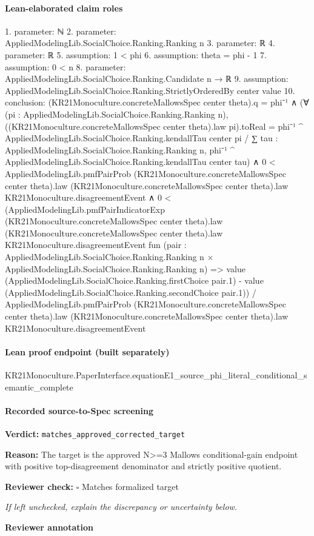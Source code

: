 \documentclass[10pt]{article}
\newcommand{\reviewerbox}{%
  \par\noindent\fbox{\parbox{0.96\linewidth}{\rule{0pt}{0.38in}}}\par
}
\newcommand{\reviewmatch}[1]{%
  \par\noindent\textbf{Reviewer check:} $\square$\; #1\par
  \noindent\emph{If left unchecked, explain the discrepancy or uncertainty below.}\par
}
\begin{document}
\paragraph{Lean-elaborated claim roles}\begin{ReviewVerbatim}
1. parameter: ℕ
2. parameter: AppliedModelingLib.SocialChoice.Ranking.Ranking n
3. parameter: ℝ
4. parameter: ℝ
5. assumption: 1 < phi
6. assumption: theta = phi - 1
7. assumption: 0 < n
8. parameter: AppliedModelingLib.SocialChoice.Ranking.Candidate n → ℝ
9. assumption: AppliedModelingLib.SocialChoice.Ranking.StrictlyOrderedBy center value
10. conclusion: (KR21Monoculture.concreteMallowsSpec center theta).q = phi⁻¹ ∧
  (∀ (pi : AppliedModelingLib.SocialChoice.Ranking.Ranking n),
      ((KR21Monoculture.concreteMallowsSpec center theta).law pi).toReal =
        phi⁻¹ ^ AppliedModelingLib.SocialChoice.Ranking.kendallTau center pi /
          ∑ tau : AppliedModelingLib.SocialChoice.Ranking.Ranking n,
            phi⁻¹ ^ AppliedModelingLib.SocialChoice.Ranking.kendallTau center tau) ∧
    0 <
        AppliedModelingLib.pmfPairProb (KR21Monoculture.concreteMallowsSpec center theta).law
          (KR21Monoculture.concreteMallowsSpec center theta).law KR21Monoculture.disagreementEvent ∧
      0 <
        (AppliedModelingLib.pmfPairIndicatorExp (KR21Monoculture.concreteMallowsSpec center theta).law
            (KR21Monoculture.concreteMallowsSpec center theta).law KR21Monoculture.disagreementEvent
            fun
              (pair :
                AppliedModelingLib.SocialChoice.Ranking.Ranking n ×
                  AppliedModelingLib.SocialChoice.Ranking.Ranking n) =>
            value (AppliedModelingLib.SocialChoice.Ranking.firstChoice pair.1) -
              value (AppliedModelingLib.SocialChoice.Ranking.secondChoice pair.1)) /
          AppliedModelingLib.pmfPairProb (KR21Monoculture.concreteMallowsSpec center theta).law
            (KR21Monoculture.concreteMallowsSpec center theta).law KR21Monoculture.disagreementEvent
\end{ReviewVerbatim}

\paragraph{Lean proof endpoint (built separately)}\begin{ReviewVerbatim}
KR21Monoculture.PaperInterface.equationE1_source_phi_literal_conditional_semantic_complete
\end{ReviewVerbatim}

\paragraph{Recorded source-to-Spec screening}
\textbf{Verdict:} \texttt{matches\_approved\_corrected\_target}
\\
{\raggedright
\textbf{Reason:} The target is the approved N>=3 Mallows conditional-\allowbreak{}gain endpoint with positive top-\allowbreak{}disagreement denominator and strictly positive quotient.\allowbreak{}
\par}
\reviewmatch{Matches formalized target}
\noindent\textbf{Reviewer annotation}\par
\reviewerbox
\clearpage
\hypertarget{source-claim-73dd5d1917ec1a7c}{}
\end{document}
